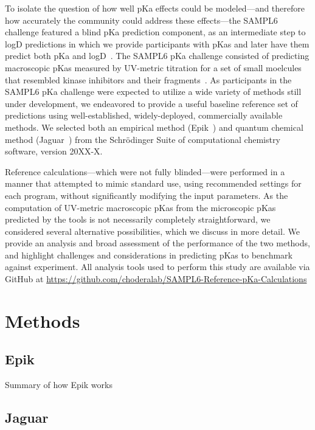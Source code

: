 \documentclass[9pt,lineno]{elife}
\begin{document}
To isolate the question of how well pKa effects could be modeled---and therefore how accurately the community could address these effects---the SAMPL6 challenge featured a blind pKa prediction component, as an intermediate step to logD predictions in which we provide participants with pKas and later have them predict both pKa and logD~\cite{sampl6-pKa-measurements}.
The SAMPL6 pKa challenge consisted of predicting macroscopic pKas measured by UV-metric titration for a set of small moelcules that resembled kinase inhibitors and their fragments~\cite{sampl6-pKa-measurements}.
As participants in the SAMPL6 pKa challenge were expected to utilize a wide variety of methods still under development, we endeavored to provide a useful baseline reference set of predictions using well-established, widely-deployed, commercially available methods.
We selected both an empirical method (Epik~\cite{Shelley:J.Comput.AidedMol.Des.:2007b}) and quantum chemical method (Jaguar~\cite{Bochevarov:Int.J.QuantumChem.:2013}) from the Schr\"{o}dinger Suite of computational chemistry software, version 20XX-X.

Reference calculations---which were not fully blinded---were performed in a manner that attempted to mimic standard use, using recommended settings for each program, without significantly modifying the input parameters.
As the computation of UV-metric macroscopic pKas from the microscopic pKas predicted by the tools is not necessarily completely straightforward, we considered several alternative possibilities, which we discuss in more detail.
We provide an analysis and broad assessment of the performance of the two methods, and highlight challenges and considerations in predicting pKas to benchmark against experiment.
All analysis tools used to perform this study are available via GitHub at
\url{https://github.com/choderalab/SAMPL6-Reference-pKa-Calculations}

\section{Methods}
\subsection{Epik}
Summary of how Epik works 

\subsection{Jaguar}
\end{document}
